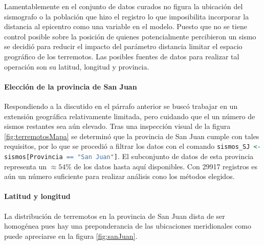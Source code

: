 \documentclass[a4paper]{report}
\begin{document}
Lamentablemente en el conjunto de datos curados no figura la ubicación del sismografo o la población que hizo el registro lo que imposibilita incorporar la distancia al epicentro como una variable en el modelo.%
Puesto que no se tiene control posible sobre la posición de quienes potencialmente percibieron un sismo se decidió para reducir el impacto del parámetro distancia limitar el espacio geográfico de los terremotos.
Las posibles fuentes de datos para realizar tal operación son su latitud, longitud y provincia.


\paragraph{Elección de la provincia de San Juan}
Respondiendo a la discutido en el párrafo anterior se buscó trabajar en un extensión geográfica relativamente limitada, pero cuidando que el un número de sismos restantes sea aún elevado.
Tras una inspección visual de la figura \ref{fig:terremotosMapa} se determinó  que la provincia de San Juan cumple con tales requisitos, por lo que se procedió a filtrar los datos con el comando \lstinline[language = R]'sismos_SJ <- sismos[Provincia == "San Juan"]'.
El subconjunto de datos de esta provincia representa un \(\approx 54 \%\) de los datos hasta aquí disponibles.
Con \num{29917} registros es aún un número suficiente para realizar análisis cono los métodos elegidos.



\paragraph{Latitud y longitud}
La distribución de terremotos en la provincia de San Juan dista de ser homogénea pues hay una preponderancia de las ubicaciones meridionales como puede apreciarse en la figura \ref{fig:sanJuan}.
\end{document}
